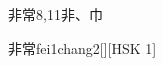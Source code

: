 \begin{entry}{非常}{8,11}{⾮、⼱}
  \begin{phonetics}{非常}{fei1chang2}[][HSK 1]
  \end{phonetics}
\end{entry}
